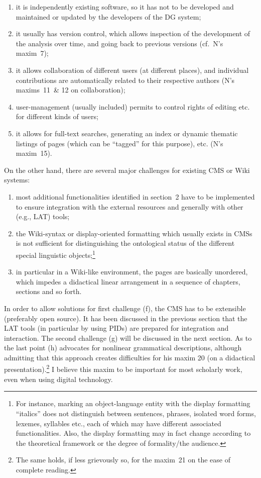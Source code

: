 \begin{enumerate}
\item it is independently existing software, so it has not to be developed and maintained or updated by the developers of the DG system;
\item it usually has version control, which allows inspection of the development of the analysis over time, and going back to previous versions (cf.~N's maxim~7); 
\item it allows collaboration of different users (at different places), and individual contributions are automatically related to their respective authors (N's maxims~11~\& 12 on collaboration); 
\item user-management (usually included) permits to control rights of editing etc. for different kinds of users;
\item it allows for full-text searches, generating an index or dynamic thematic listings of pages (which can be ``tagged'' for this purpose), etc. (N's maxim~15).
\end{enumerate}
On the other hand, there are several major challenges for existing CMS or Wiki systems:

\begin{enumerate}
\item \label{bkm:Ref297464324}most additional functionalities identified in section~2 have to be implemented to ensure integration with the external resources and generally with other (e.g., LAT) tools;
\item \label{bkm:Ref297464521}the Wiki-syntax or display-oriented formatting which usually exists in CMSs is not sufficient for distinguishing the ontological status of the different special linguistic objects;\footnote{For 
 instance, marking an object-language entity with the display formatting ``italics'' does not distinguish between sentences, phrases, isolated word forms, lexemes, syllables etc., each of which may have different associated functionalities. Also, the display formatting may in fact change according to the theoretical framework or the degree of formality/the audience.}
\item \label{bkm:Ref297461869}in particular in a Wiki-like environment, the pages are basically unordered, which impedes a didactical linear arrangement in a sequence of chapters, sections and so forth.
\end{enumerate}

In order to allow solutions for first challenge (f), the CMS has to be extensible (preferably open source). It has been discussed in the previous section that the LAT tools (in particular by using PIDs) are prepared for integration and interaction. 
The second challenge (g) will be discussed in the next section. As to the last point (h) \citet{Nordhoff2008} advocates for nonlinear grammatical descriptions, although admitting that this approach creates difficulties for his maxim 20 (on a didactical presentation).\footnote{The 
 same holds, if less grievously so, for the maxim~21 on the ease of complete reading.
} 
I believe this maxim to be important for most scholarly work, even when using digital technology.

